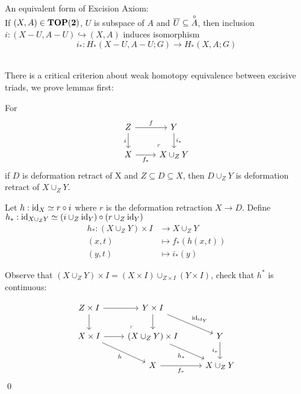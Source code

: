     \begin{note}
        An equivalent form of Excision  Axiom:\\
        If $(X,A) \in \mathbf{TOP(2)}$, $U$ is subspace of $A$ and $\overline{U} \subseteq \overset{\circ}{A}$,
        then inclusion $ i : (X - U, A - U) \hookrightarrow (X,A) $
        induces isomorphism
        $$
        i_* : H_*(X-U, A-U;G) \to H_*(X,A;G)
        $$\\
    \end{note}

    There is a critical criterion about weak homotopy equivalence between excisive triads,
    we prove lemmas first:

    \begin{lem}
        \label{hyp:pushout-preserve-dr}
        For
        \[\begin{tikzcd}
            Z & Y \\
            X & {X \cup_Z Y}
            \arrow["i"', from=1-1, to=2-1]
            \arrow["f", from=1-1, to=1-2]
            \arrow["{i_*}", from=1-2, to=2-2]
            \arrow["{f_*}"', from=2-1, to=2-2]
            \arrow["\lrcorner"{anchor=center, pos=0.125, rotate=180}, draw=none, from=2-2, to=1-1]
        \end{tikzcd}\]
        if $D$ is deformation retract of X and $Z \subseteq D \subseteq X $,
        then $D \cup_Z Y $ is deformation retract of $X \cup_Z Y$.
    \end{lem}

    \begin{prf}
        Let $h : \mathrm{id}_X \simeq r \circ i$ where $r$ is the deformation retraction
        $X \to D$.
        Define $h_* : \mathrm{id}_{X \cup_Z Y} \simeq (i \cup_Z \mathrm{id}_Y) \circ (r \cup_Z \mathrm{id}_Y)$
        \begin{align*}
            h_* : (X \cup_Z Y) \times I & \to X \cup_Z Y\\
            (x,t) & \mapsto f_*(h(x,t))\\
            (y,t) & \mapsto i_*(y)
        \end{align*}

        Observe that $(X \cup_Z Y) \times I = (X \times I) \cup_{Z \times I} (Y \times I)$,
        check that $h^*$ is continuous:

        \[\begin{tikzcd}
            {Z \times I} & {Y \times I} \\
            {X \times I} & {(X\cup_Z Y) \times I} & Y \\
            & X & {X \cup_Z Y}
            \arrow[from=1-1, to=2-1]
            \arrow[from=1-1, to=1-2]
            \arrow[from=2-1, to=2-2]
            \arrow[from=1-2, to=2-2]
            \arrow["\lrcorner"{anchor=center, pos=0.125, rotate=180}, draw=none, from=2-2, to=1-1]
            \arrow["{\id_{\id_Y}}", from=1-2, to=2-3]
            \arrow["h"', from=2-1, to=3-2]
            \arrow["{i_*}"', from=2-3, to=3-3]
            \arrow["{f_*}"', from=3-2, to=3-3]
            \arrow["{h_*}"', from=2-2, to=3-3]
        \end{tikzcd}\]
        \qed
    \end{prf}

